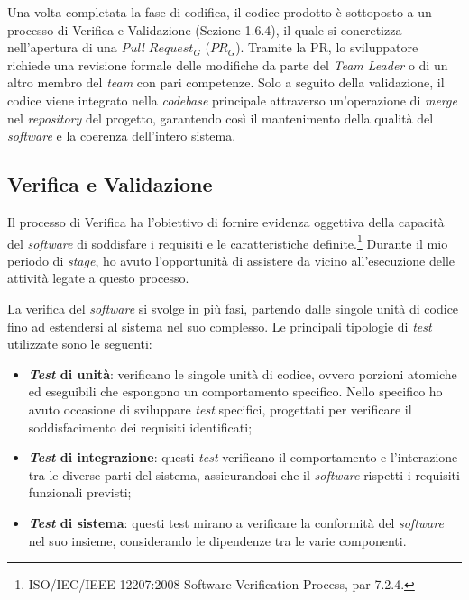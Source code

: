         \vspace{0.2 em}
        \noindent Una volta completata la fase di codifica, il codice prodotto è sottoposto a un processo di Verifica e Validazione (Sezione 1.6.4), il quale si concretizza nell'apertura di una \textit{Pull $Request_G$} ($PR_G$). Tramite la PR, lo sviluppatore richiede una revisione formale delle modifiche da parte del \textit{Team Leader} o di un altro membro del \textit{team} con pari competenze. Solo a seguito della validazione, il codice viene integrato nella \textit{codebase} principale attraverso un'operazione di \textit{merge} nel \textit{repository} del progetto, garantendo così il mantenimento della qualità del \textit{software} e la coerenza dell’intero sistema.

        
        \subsection{Verifica e Validazione}
        Il processo di Verifica ha l’obiettivo di fornire evidenza oggettiva della capacità del \textit{software} di soddisfare i requisiti e le caratteristiche definite.\footnote{ISO/IEC/IEEE 12207:2008 Software Verification Process, par 7.2.4.} Durante il mio periodo di \textit{stage}, ho avuto l'opportunità di assistere da vicino all'esecuzione delle attività legate a questo processo.

        \vspace{0.2 em}
        \noindent La verifica del \textit{software} si svolge in più fasi, partendo dalle singole unità di codice fino ad estendersi al sistema nel suo complesso. Le principali tipologie di \textit{test} utilizzate sono le seguenti:
        \begin{itemize}
        \item \textbf{\textit{Test} di unità}: verificano le singole unità di codice, ovvero porzioni atomiche ed eseguibili che espongono un comportamento specifico. Nello specifico ho avuto occasione di sviluppare \textit{test} specifici, progettati per verificare il soddisfacimento dei requisiti identificati;

        \item \textbf{\textit{Test} di integrazione}: questi \textit{test} verificano il comportamento e l'interazione tra le diverse parti del sistema, assicurandosi che il \textit{software} rispetti i requisiti funzionali previsti;

        \item \textbf{\textit{Test} di sistema}: questi test mirano a verificare la conformità del \textit{software} nel suo insieme, considerando le dipendenze tra le varie componenti.
        \end{itemize}


